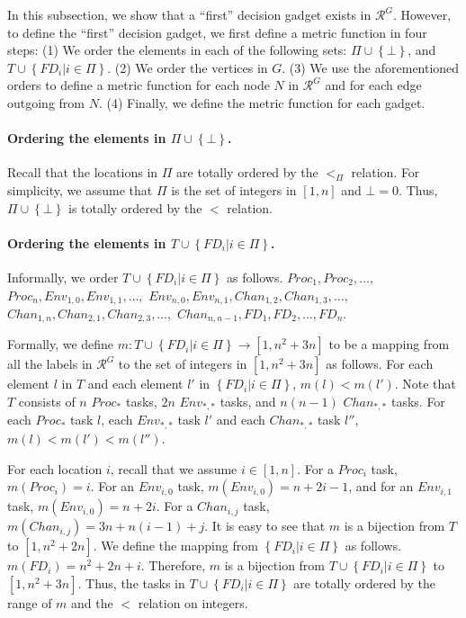 \documentclass[11pt]{article}
\numberwithin{theorem}{section}
\newcommand{\set}[1]{\left\{#1\right\}}
\begin{document}
In this subsection, we show
that a ``first'' decision gadget exists in $\mathcal{R}^G$. However, to define the ``first'' decision gadget, we first define a metric function 
in four steps: (1) We order the elements in each of the following sets: $\Pi \cup \set{\bot}$, and
$T \cup \set{FD_i | i \in \Pi}$. (2) We order the vertices in $G$. (3) We use the aforementioned orders to define a metric function for each node $N$ in $\mathcal{R}^G$ and for each edge outgoing from $N$. (4) Finally, we define the metric function for each gadget.

\paragraph{Ordering the elements in $\Pi \cup \set{\bot}$.}
Recall that the locations in $\Pi$ are totally ordered by the $<_\Pi$ relation. For simplicity, we assume that $\Pi$ is the set of integers in $[1,n]$ and $\bot = 0$. Thus, $\Pi \cup \set{\bot}$ is totally ordered by the $<$ relation.



\paragraph{Ordering the elements in $T \cup \set{FD_i | i \in \Pi}$.}
Informally, we order $T \cup \set{FD_i | i \in \Pi}$ as follows. $Proc_1,Proc_2,\ldots,$ $Proc_n,Env_{1,0},Env_{1,1},\ldots,$ $Env_{n,0},Env_{n,1}, Chan_{1,2},Chan_{1,3},\ldots,$ \\ $Chan_{1,n},Chan_{2,1},Chan_{2,3},\ldots,$ $Chan_{n,n-1},FD_1,FD_2,\ldots,FD_n$.

Formally, we define  $m: T \cup \set{FD_i | i \in \Pi} \rightarrow [1, n^2 + 3n]$ to be a mapping from all the labels in $\mathcal{R}^G$ to the set of integers in $[1, n^2 + 3n]$ as follows. For each element $l$ in $T$ and each element $l'$ in $\set{FD_i | i \in \Pi}$, $m(l) < m(l')$. Note that $T$ consists of $n$ $Proc_*$ tasks, $2n$ $Env_{*,*}$ tasks, and $n(n-1)$ $Chan_{*,*}$ tasks. For each $Proc_*$ task $l$, each $Env_{*,*}$ task $l'$ and each $Chan_{*,*}$ task $l''$, $m(l) < m(l') < m(l'')$.

For each location $i$, recall that we assume $i \in [1,n]$. For a $Proc_i$ task, $m(Proc_i) = i$. For an $Env_{i,0}$ task, $m(Env_{i,0}) = n + 2i - 1$, and for an $Env_{i,1}$ task, $m(Env_{i,0}) = n + 2i$.
For a $Chan_{i,j}$ task, $m(Chan_{i,j}) = 3n + n(i-1) + j$. It is easy to see that $m$ is a bijection from $T$ to $[1, n^2 + 2n]$. 
We define the mapping from $\set{FD_i | i \in \Pi}$ as follows. $m(FD_i) = n^2+2n + i$. Therefore, $m$ is a bijection from $T \cup \set{FD_i | i \in \Pi}$ to $[1, n^2 + 3n]$.
Thus, the tasks in $T \cup \set{FD_i | i \in \Pi}$ are totally ordered by the range of $m$ and the $<$ relation on integers.
\end{document}
